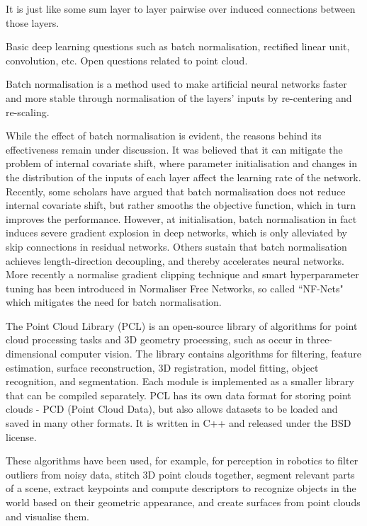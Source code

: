 It is just like some sum layer to layer pairwise over induced connections between those layers.

Basic deep learning questions such as batch normalisation, rectified linear unit, convolution, etc. Open questions related to point cloud.

Batch normalisation is a method used to make artificial neural networks faster and more stable through normalisation of the layers' inputs by re-centering and re-scaling.

While the effect of batch normalisation is evident, the reasons behind its effectiveness remain under discussion. It was believed that it can mitigate the problem of internal covariate shift, where parameter initialisation and changes in the distribution of the inputs of each layer affect the learning rate of the network. Recently, some scholars have argued that batch normalisation does not reduce internal covariate shift, but rather smooths the objective function, which in turn improves the performance. However, at initialisation, batch normalisation in fact induces severe gradient explosion in deep networks, which is only alleviated by skip connections in residual networks. Others sustain that batch normalisation achieves length-direction decoupling, and thereby accelerates neural networks. More recently a normalise gradient clipping technique and smart hyperparameter tuning has been introduced in Normaliser Free Networks, so called ``NF-Nets" which mitigates the need for batch normalisation.

The Point Cloud Library (PCL) is an open-source library of algorithms for point cloud processing tasks and 3D geometry processing, such as occur in three-dimensional computer vision. The library contains algorithms for filtering, feature estimation, surface reconstruction, 3D registration, model fitting, object recognition, and segmentation. Each module is implemented as a smaller library that can be compiled separately. PCL has its own data format for storing point clouds - PCD (Point Cloud Data), but also allows datasets to be loaded and saved in many other formats. It is written in C++ and released under the BSD license.

These algorithms have been used, for example, for perception in robotics to filter outliers from noisy data, stitch 3D point clouds together, segment relevant parts of a scene, extract keypoints and compute descriptors to recognize objects in the world based on their geometric appearance, and create surfaces from point clouds and visualise them.


